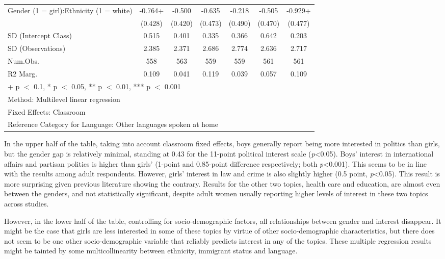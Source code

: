 \documentclass[
  letterpaper,
  DIV=11,
  numbers=noendperiod]{scrreprt}
\begin{document}
\begin{table}
\begin{tabular}[t]{lcccccc}
\hspace{1em}Gender (1 = girl):Ethnicity (1 = white) & -0.764+ & -0.500 & -0.635 & -0.218 & -0.505 & -0.929+\\
\hspace{1em} & (0.428) & (0.420) & (0.473) & (0.490) & (0.470) & (0.477)\\
\hspace{1em}SD (Intercept Class) & 0.515 & 0.401 & 0.335 & 0.366 & 0.642 & 0.203\\
\hspace{1em}SD (Observations) & 2.385 & 2.371 & 2.686 & 2.774 & 2.636 & 2.717\\
\hspace{1em}Num.Obs. & 558 & 563 & 559 & 559 & 561 & 561\\
\hspace{1em}R2 Marg. & 0.109 & 0.041 & 0.119 & 0.039 & 0.057 & 0.109\\
\bottomrule
\multicolumn{7}{l}{\rule{0pt}{1em}+ p $<$ 0.1, * p $<$ 0.05, ** p $<$ 0.01, *** p $<$ 0.001}\\
\multicolumn{7}{l}{\rule{0pt}{1em}Method: Multilevel linear regression}\\
\multicolumn{7}{l}{\rule{0pt}{1em}Fixed Effects: Classroom}\\
\multicolumn{7}{l}{\rule{0pt}{1em}Reference Category for Language: Other languages spoken at home}\\
\end{tabular}
\end{table}

In the upper half of the table, taking into account classroom fixed
effects, boys generally report being more interested in politics than
girls, but the gender gap is relatively minimal, standing at 0.43 for
the 11-point political interest scale (\emph{p}\textless0.05). Boys'
interest in international affairs and partisan politics is higher than
girls' (1-point and 0.85-point difference respectively; both
\emph{p}\textless0.001). This seems to be in line with the results among
adult respondents. However, girls' interest in law and crime is also
slightly higher (0.5 point, \emph{p}\textless0.05). This result is more
surprising given previous literature showing the contrary. Results for
the other two topics, health care and education, are almost even between
the genders, and not statistically significant, despite adult women
usually reporting higher levels of interest in these two topics across
studies.

However, in the lower half of the table, controlling for
socio-demographic factors, all relationships between gender and interest
disappear. It might be the case that girls are less interested in some
of these topics by virtue of other socio-demographic characteristics,
but there does not seem to be one other socio-demographic variable that
reliably predicts interest in any of the topics. These multiple
regression results might be tainted by some multicollinearity between
ethnicity, immigrant status and language.
\end{document}
